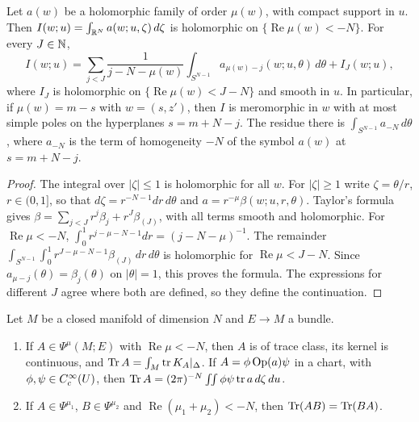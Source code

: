 \begin{lemma}\label{tr:lem:polar}
Let \(a(w)\) be a holomorphic family of order \(\mu(w)\), with compact
support in \(u\). Then \(I(w;u)=\int_{\mathbb R^N}a(w;u,\zeta)\,d\zeta\) is
holomorphic on \(\{\operatorname{Re}\mu(w)<-N\}\). For every \(J\in\mathbb N\),
\[
 I(w;u)=\sum_{j<J}\frac{1}{j-N-\mu(w)}\int_{S^{N-1}}a_{\mu(w)-j}(w;u,\theta)
 \,d\theta+I_J(w;u),
\]
where \(I_J\) is holomorphic on \(\{\operatorname{Re}\mu(w)<J-N\}\) and smooth
in \(u\). In particular, if \(\mu(w)=m-s\) with \(w=(s,z')\), then \(I\) is
meromorphic in \(w\) with at most simple poles on the hyperplanes
\(s=m+N-j\). The residue there is \(\int_{S^{N-1}}a_{-N}\,d\theta\), where
\(a_{-N}\) is the term of homogeneity \(-N\) of the symbol \(a(w)\) at
\(s=m+N-j\).
\end{lemma}

\begin{proof}
The integral over \(|\zeta|\le1\) is holomorphic for all \(w\). For
\(|\zeta|\ge1\) write \(\zeta=\theta/r\), \(r\in(0,1]\), so that
\(d\zeta=r^{-N-1}dr\,d\theta\) and \(a=r^{-\mu}\beta(w;u,r,\theta)\). Taylor's
formula gives \(\beta=\sum_{j<J}r^j\beta_j+r^J\beta_{(J)}\), with all terms
smooth and holomorphic. For \(\operatorname{Re}\mu<-N\),
\(\int_0^1r^{j-\mu-N-1}dr=(j-N-\mu)^{-1}\). The remainder
\(\int_{S^{N-1}}\int_0^1r^{J-\mu-N-1}\beta_{(J)}\,dr\,d\theta\) is
holomorphic for \(\operatorname{Re}\mu<J-N\). Since
\(a_{\mu-j}(\theta)=\beta_j(\theta)\) on \(|\theta|=1\), this proves the
formula. The expressions for different \(J\) agree where both are defined,
so they define the continuation.
\end{proof}

\begin{lemma}\label{tr:lem:tc}
Let \(M\) be a closed manifold of dimension \(N\) and \(E\to M\) a bundle.
\begin{enumerate}
\item If \(A\in\Psi^\mu(M;E)\) with \(\operatorname{Re}\mu<-N\), then \(A\)
is of trace class, its kernel is continuous, and
\(\operatorname{Tr} A=\int_M\operatorname{tr} K_A|_\Delta\). If \(A=\phi\operatorname{Op}(a)\psi\) in a chart, with
\(\phi,\psi\in C^\infty_c(U)\), then
\(\operatorname{Tr} A=(2\pi)^{-N}\int\!\!\int\phi\psi\operatorname{tr} a\,d\zeta\,du\).
\item If \(A\in\Psi^{\mu_1}\), \(B\in\Psi^{\mu_2}\) and
\(\operatorname{Re}(\mu_1+\mu_2)<-N\), then \(\operatorname{Tr}(AB)=\operatorname{Tr}(BA)\).
\end{enumerate}
\end{lemma}


